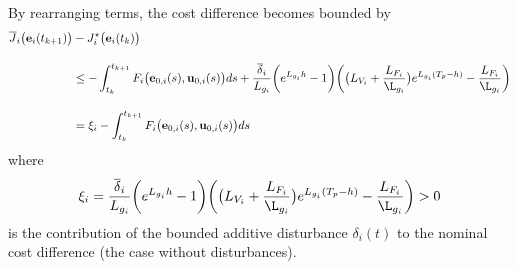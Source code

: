 By rearranging terms, the cost difference becomes bounded by
\begin{align}
  \overline{J}_i\big(\vect{e}_i(t_{k+1})\big) &- J_i^{\star}\big(\vect{e}_i(t_k)\big) \\[2.5ex]
  &\leq -\int_{t_k}^{t_{k+1}} F_i \big(\vect{e}_{0,i}(s), \vect{u}_{0,i} (s)\big) d s
    + \dfrac{\overline{\delta}_i}{L_{g_i}} \bigg(e^{L_{g_i}h} - 1\bigg)
    \bigg(\big(L_{V_i} + \dfrac{L_{F_i}}{\L_{g_i}}\big) e^{L_{g_i}(T_p-h)}  - \dfrac{L_{F_i}}{\L_{g_i}}\bigg) \\[2.5ex]
  &= \xi_i -\int_{t_k}^{t_{k+1}} F_i \big(\vect{e}_{0,i}(s), \vect{u}_{0,i} (s)\big) d s
\end{align}
where
\begin{align}
  \xi_i = \dfrac{\overline{\delta}_i}{L_{g_i}} \bigg(e^{L_{g_i}h} - 1\bigg)
    \bigg(\big(L_{V_i} + \dfrac{L_{F_i}}{\L_{g_i}}\big) e^{L_{g_i}(T_p-h)}  - \dfrac{L_{F_i}}{\L_{g_i}}\bigg) > 0
\end{align}
is the contribution of the bounded additive disturbance $\delta_i(t)$
to the nominal cost difference (the case without disturbances).

